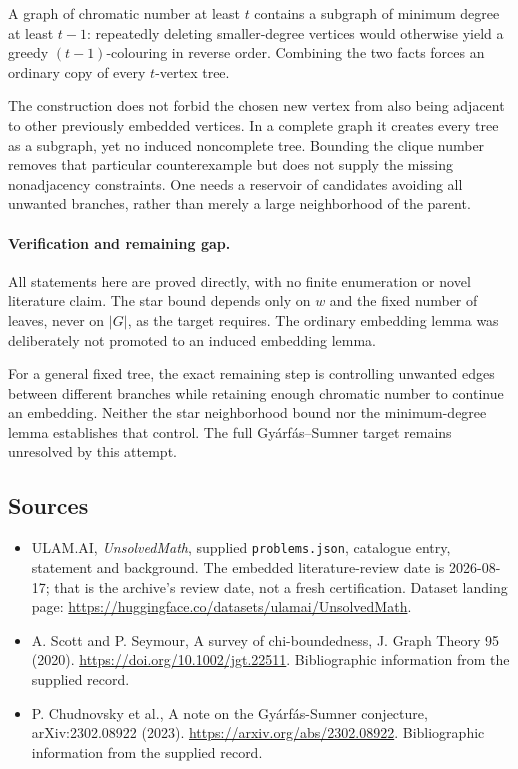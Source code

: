 \documentclass[11pt,a4paper]{article}
\begin{document}
A graph of chromatic number at least $t$ contains a subgraph of minimum degree at least $t-1$: repeatedly deleting smaller-degree vertices would otherwise yield a greedy $(t-1)$-colouring in reverse order. Combining the two facts forces an ordinary copy of every $t$-vertex tree.

The construction does not forbid the chosen new vertex from also being adjacent to other previously embedded vertices. In a complete graph it creates every tree as a subgraph, yet no induced noncomplete tree. Bounding the clique number removes that particular counterexample but does not supply the missing nonadjacency constraints. One needs a reservoir of candidates avoiding all unwanted branches, rather than merely a large neighborhood of the parent.

\paragraph{Verification and remaining gap.}
All statements here are proved directly, with no finite enumeration or novel literature claim. The star bound depends only on $w$ and the fixed number of leaves, never on $|G|$, as the target requires. The ordinary embedding lemma was deliberately not promoted to an induced embedding lemma.

For a general fixed tree, the exact remaining step is controlling unwanted edges between different branches while retaining enough chromatic number to continue an embedding. Neither the star neighborhood bound nor the minimum-degree lemma establishes that control. The full Gy\'arf\'as--Sumner target remains unresolved by this attempt.

\subsection{Sources}

{\small

\begin{itemize}

\item[\hypertarget{source:statement:1}{S1}] ULAM.AI, \emph{UnsolvedMath}, supplied \texttt{problems.json}, catalogue entry, statement and background. The embedded literature-review date is 2026-08-17; that is the archive’s review date, not a fresh certification. Dataset landing page: \url{https://huggingface.co/datasets/ulamai/UnsolvedMath}.

\item[\hypertarget{source:statement:2}{S2}] A. Scott and P. Seymour, A survey of chi-boundedness, J. Graph Theory 95 (2020). \url{https://doi.org/10.1002/jgt.22511}. Bibliographic information from the supplied record.

\item[\hypertarget{source:statement:3}{S3}] P. Chudnovsky et al., A note on the Gyárfás-Sumner conjecture, arXiv:2302.08922 (2023). \url{https://arxiv.org/abs/2302.08922}. Bibliographic information from the supplied record.

\end{itemize}

}

\label{end:statement}
\end{document}
